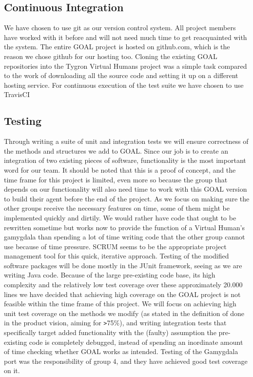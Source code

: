 \documentclass[]{article}
\begin{document}
\subsection{Continuous Integration}
We have chosen to use git as our version control system. All project members have worked with it before and will not need much time to get reacquainted with the system. The entire GOAL project is hosted on \gls{github.com}, which is the reason we chose github for our hosting too. Cloning the existing GOAL repositories into the Tygron Virtual Humans project was a simple task compared to the work of downloading all the source code and setting it up on a different hosting service.
For continuous execution of the test suite we have chosen to use TravisCI

\subsection{Testing}
Through writing a suite of unit and integration tests we will ensure correctness of the methods and structures we add to GOAL. Since our job is to create an integration of two existing pieces of software, functionality is the most important word for our team. It should be noted that this is a proof of concept, and the time frame for this project is limited, even more so because the group that depends on our functionality will also need time to work with this GOAL version to build their agent before the end of the project. As we focus on making sure the other groups receive the necessary features on time, some of them might be implemented quickly and dirtily. We would rather have code that ought to be rewritten sometime but works now to provide the function of a Virtual Human's gamygdala than spending a lot of time writing code that the other group cannot use because of time pressure. SCRUM seems to be the appropriate project management tool for this quick, iterative approach.
Testing of the modified software packages will be done mostly in the \gls{JUnit} framework, seeing as we are writing Java code. Because of the large pre-existing code base, its high complexity and the relatively low test coverage over these approximately 20.000 lines we have decided that achieving high coverage on the GOAL project is not feasible within the time frame of this project. We will focus on achieving high unit test coverage on the methods we modify (as stated in the definition of done in the product vision, aiming for \verb|>|75\%), and writing integration tests that specifically target added functionality with the (faulty) assumption the pre-existing code is completely debugged, instead of spending an inordinate amount of time checking whether GOAL works as intended. Testing of the Gamygdala port was the responsibility of group 4, and they have achieved good test coverage on it. 
\end{document}
